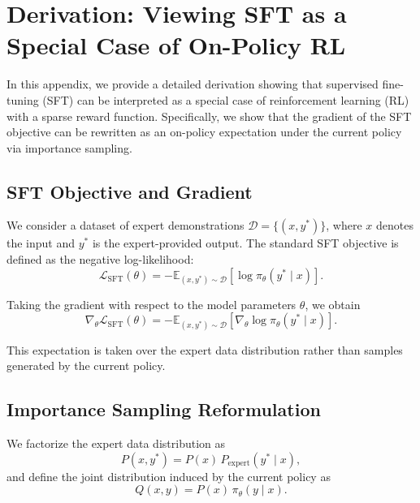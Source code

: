 \section{Derivation: Viewing SFT as a Special Case of On-Policy RL}
\label{sec:proof}

In this appendix, we provide a detailed derivation showing that supervised fine-tuning (SFT) can be interpreted as a special case of reinforcement learning (RL) with a sparse reward function. Specifically, we show that the gradient of the SFT objective can be rewritten as an on-policy expectation under the current policy via importance sampling.

\subsection{SFT Objective and Gradient}

We consider a dataset of expert demonstrations
\(
\mathcal{D} = \{(x, y^*)\}
\),
where \(x\) denotes the input and \(y^*\) is the expert-provided output. The standard SFT objective is defined as the negative log-likelihood:
\begin{equation}
\mathcal{L}_{\mathrm{SFT}}(\theta)
=
-\mathbb{E}_{(x,y^*) \sim \mathcal{D}}
\left[
\log \pi_\theta(y^* \mid x)
\right].
\end{equation}

Taking the gradient with respect to the model parameters \(\theta\), we obtain
\begin{equation}
\nabla_\theta \mathcal{L}_{\mathrm{SFT}}(\theta)
=
-
\mathbb{E}_{(x,y^*) \sim \mathcal{D}}
\left[
\nabla_\theta \log \pi_\theta(y^* \mid x)
\right].
\label{eq:sft_grad_expert}
\end{equation}

This expectation is taken over the expert data distribution rather than samples generated by the current policy.

\subsection{Importance Sampling Reformulation}

We factorize the expert data distribution as
\begin{equation}
P(x, y^*) = P(x)\, P_{\mathrm{expert}}(y^* \mid x),
\end{equation}
and define the joint distribution induced by the current policy as
\begin{equation}
Q(x, y) = P(x)\, \pi_\theta(y \mid x).
\end{equation}

